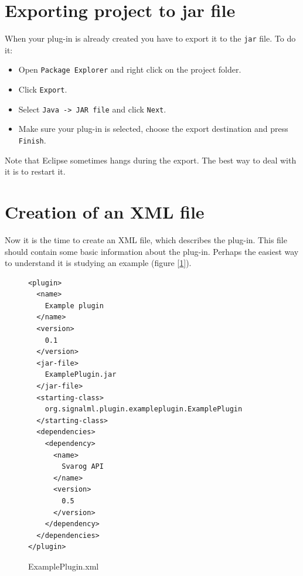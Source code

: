 \documentclass{article}
\begin{document}
\section{Exporting project to jar file}
\label{jar-export}

When your plug-in is already created you have to export it to the \verb=jar= file.
To do it:
\begin{itemize}
	\item Open \verb=Package Explorer= and right click on the project folder.
	\item Click \verb=Export=.
	\item Select \verb=Java -> JAR file= and click \verb=Next=.
	\item Make sure your plug-in is selected, choose the export destination and press \verb=Finish=.
\end{itemize}

Note that Eclipse sometimes hangs during the export.
The best way to deal with it is to restart it.

\section{Creation of an XML file}
\label{XML-description}
Now it is the time to create an XML file, which describes the plug-in.
This file should contain some basic information about the plug-in.
Perhaps the easiest way to understand it is studying an example (figure [\ref{xml_listing}]).
\begin{figure}
\small
\label{xml_listing}
\begin{lstlisting}[frame=tblr]
<plugin>
  <name>
    Example plugin
  </name>
  <version>
    0.1
  </version>
  <jar-file>
  	ExamplePlugin.jar
  </jar-file>
  <starting-class>
    org.signalml.plugin.exampleplugin.ExamplePlugin
  </starting-class>
  <dependencies>
    <dependency>
      <name>
        Svarog API
      </name>
      <version>
        0.5
      </version>
    </dependency>
  </dependencies>
</plugin>
\end{lstlisting}
\caption{ExamplePlugin.xml}
\end{figure}
\end{document}
